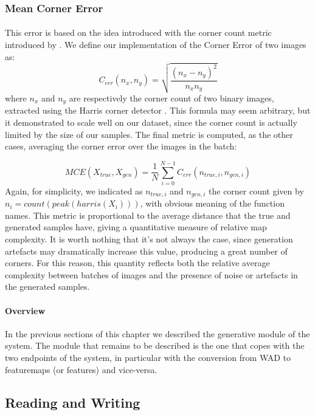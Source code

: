 \subsubsection{Mean Corner Error}
\paragraph{} This error is based on the idea introduced with the corner count metric introduced by \cite{slam}. We define our implementation of the Corner Error of two images as:
\begin{equation}
C_{err}(n_{x}, n_{y}) = \sqrt{\frac{(n_{x} - n_{y})^2}{n_{x}n_{y}}}
\end{equation}
where $n_{x}$ and $n_{y}$ are respectively the corner count of two binary images, extracted using the Harris corner detector \cite{harrisdetector}.
This formula may seem arbitrary, but it demonstrated to scale well on our dataset, since the corner count is actually limited by the size of our samples. The final metric is computed, as the other cases, averaging the corner error over the images in the batch:

\begin{equation}
MCE(X_{true}, X_{gen}) = \frac{1}{N} \sum_{i=0}^{N-1} C_{err}(n_{true,i}, n_{gen,i})
\end{equation}
Again, for simplicity, we indicated as $ n_{true,i} $ and $ n_{gen,i} $ the corner count given by \\ $ n_{i} = count(peak(harris(X_{i}))) $, with obvious meaning of the function names.
This metric is proportional to the average distance that the true and generated samples have, giving a quantitative measure of relative map complexity. It is worth nothing that it's not always the case, since generation artefacts may dramatically increase this value, producing a great number of corners. For this reason, this quantity reflects both the relative average complexity between batches of images and the presence of noise or artefacts in the generated samples.

\label{sec:editor}
\paragraph{Overview} In the previous sections of this chapter we described the generative module of the system. The module that remains to be described is the one that copes with the two endpoints of the system, in particular with the conversion from WAD to \glspl{featuremap} (or features) and vice-versa. 
\subsection{Reading and Writing}
